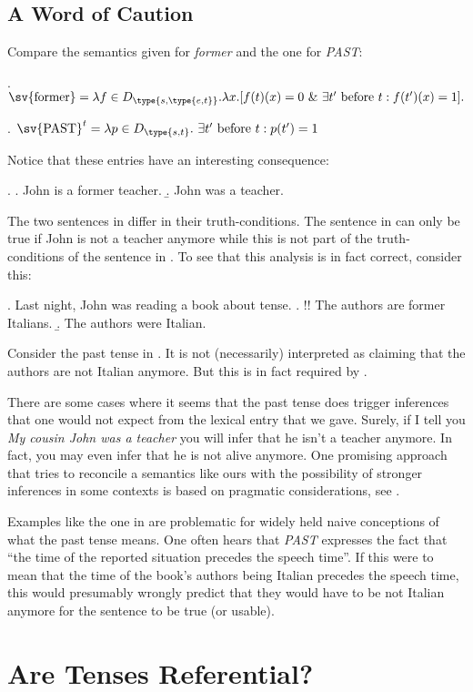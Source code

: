 \subsection{A Word of Caution}
Compare the semantics given for \emph{former} and the one for \emph{PAST}:

\ex. $\sv{\mbox{former}} = \lambda f \in D_{\type{s,\type{e,t}}}. \lambda x.[f(t)(x)=0\ \&\ \exists t' \mbox{ before } t: f(t')(x) = 1].$

\ex. $\sv{\mbox{PAST}}^{t} = \ensuremath{\lambda}p\ensuremath{\in}D_{\type{s,t}}.\ \ensuremath{\exists}t'\mbox{ before }t: p(t') = 1$

Notice that these entries have an interesting consequence:

\ex. \a. John is a former teacher.
\b. John was a teacher.

The two sentences in \Last differ in their truth-conditions. The sentence in \Last[a] can only be true if John is not a teacher anymore while this is not part of the truth-conditions of the sentence in \Last[b]. To see that this analysis is in fact correct, consider this:

\ex. Last night, John was reading a book about tense.
\a. !! The authors are former Italians.
\b.  The authors were Italian.

Consider the past tense in \Last[b]. It is not (necessarily) interpreted as claiming that the authors are not Italian anymore. But this is in fact required by \Last[a].

There are some cases where it seems that the past tense does trigger inferences that one would not expect from the lexical entry that we gave. Surely, if I tell you \emph{My cousin John was a teacher} you will infer that he isn't a teacher anymore. In fact, you may even infer that he is not alive anymore. One promising approach that tries to reconcile a semantics like ours with the possibility of stronger inferences in some contexts is based on pragmatic considerations, see \cite{musan:1997:lifetime}.

Examples like the one in \Last are problematic for widely held naive conceptions of what the past tense means. One often hears that \emph{PAST} expresses the fact that ``the time of the reported situation precedes the speech time''. If this were to mean that the time of the book's authors being Italian precedes the speech time, this would presumably wrongly predict that they would have to be not Italian anymore for the sentence to be true (or usable).

\section{Are Tenses Referential?}

